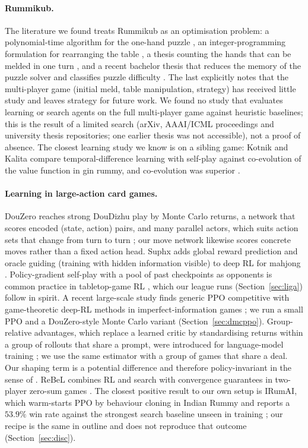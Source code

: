 \documentclass[11pt]{article}
\begin{document}
\paragraph{Rummikub.} The literature we found treats Rummikub as an optimisation problem: a polynomial-time algorithm for the one-hand puzzle \cite{vanrijn2016}, an integer-programming formulation for rearranging the table \cite{denhertog2006}, a thesis counting the hands that can be melded in one turn \cite{feijen2023}, and a recent bachelor thesis that reduces the memory of the puzzle solver and classifies puzzle difficulty \cite{wekken2025}. The last explicitly notes that the multi-player game (initial meld, table manipulation, strategy) has received little study and leaves strategy for future work. We found no study that evaluates learning or search agents on the full multi-player game against heuristic baselines; this is the result of a limited search (arXiv, AAAI/ICML proceedings and university thesis repositories; one earlier thesis was not accessible), not a proof of absence. The closest learning study we know is on a sibling game: Kotnik and Kalita compare temporal-difference learning with self-play against co-evolution of the value function in gin rummy, and co-evolution was superior \cite{kotnik2003}.
\paragraph{Learning in large-action card games.} DouZero reaches strong DouDizhu play by Monte Carlo returns, a network that scores encoded (state, action) pairs, and many parallel actors, which suits action sets that change from turn to turn \cite{zha2021}; our move network likewise scores concrete moves rather than a fixed action head. Suphx adds global reward prediction and oracle guiding (training with hidden information visible) to deep RL for mahjong \cite{li2020}. Policy-gradient self-play with a pool of past checkpoints as opponents is common practice in tabletop-game RL \cite{balla2024}, which our league runs (Section~\ref{sec:liga}) follow in spirit. A recent large-scale study finds generic PPO \cite{schulman2017} competitive with game-theoretic deep-RL methods in imperfect-information games \cite{rudolph2025}; we run a small PPO and a DouZero-style Monte Carlo variant (Section~\ref{sec:dmcppo}). Group-relative advantages, which replace a learned critic by standardising returns within a group of rollouts that share a prompt, were introduced for language-model training \cite{shao2024}; we use the same estimator with a group of games that share a deal. Our shaping term is a potential difference and therefore policy-invariant in the sense of \cite{ng1999}. ReBeL combines RL and search with convergence guarantees in two-player zero-sum games \cite{brown2020}. The closest positive result to our own setup is IRumAI, which warm-starts PPO by behaviour cloning in Indian Rummy and reports a $53.9\%$ win rate against the strongest search baseline unseen in training \cite{mohan2026}; our recipe is the same in outline and does not reproduce that outcome (Section~\ref{sec:disc}).
\end{document}
